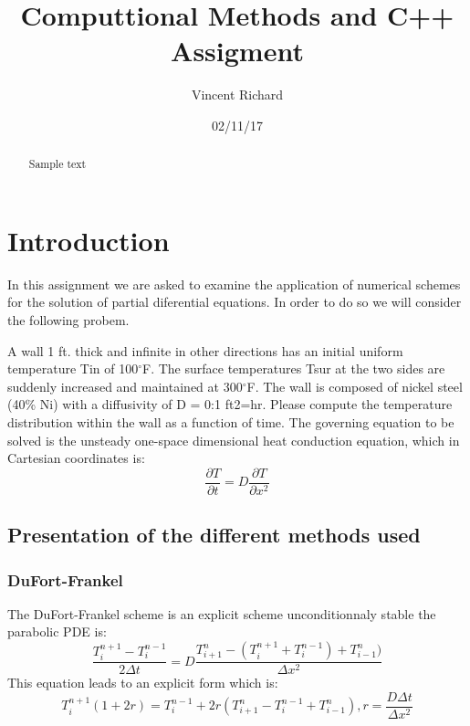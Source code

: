 \documentclass [10 pt, a4 paper]{article}
\author{Vincent Richard}
\date{02/11/17}
\title{Computtional Methods and C++ Assigment}
\begin{document}
\begin{titlepage}
    \maketitle
\end{titlepage}
\newpage

\begin{abstract}
    Sample text
\end{abstract}

\tableofcontents
\listoffigures
\listoftables
\newpage


\section{Introduction}
In this assignment we are asked to examine the application of numerical schemes
for the solution of partial diferential equations. In order to  do so we will consider 
the following probem.

A wall 1 ft. thick and infinite in other directions has an initial uniform temperature Tin of 100$^{\circ}$F. The surface temperatures Tsur at the two
sides are suddenly increased and maintained at 300$^{\circ}$F. The wall is composed of
nickel steel (40\% Ni) with a diffusivity of D = 0:1 ft2=hr. Please compute the
temperature distribution within the wall as a function of time.
The governing equation to be solved is the unsteady one-space dimensional
heat conduction equation, which in Cartesian coordinates is:
\begin{equation}
    \frac{\partial T}{\partial t} = D \frac{\partial T}{\partial x^{2}}
\end{equation}

\subsection{Presentation of the different methods used}

\subsubsection{DuFort-Frankel}
The DuFort-Frankel scheme is an explicit scheme unconditionnaly stable the parabolic PDE is:
\begin{equation}
    \frac{T_{i}^{n+1} - T_{i}^{n-1}}{2\Delta t} = D \frac{T_{i+1}^{n} -(T_{i}^{n+1} + T_{i}^{n-1}) + T_{i-1}^{n})}{\Delta x^{2}}
\end{equation}
This equation leads to an explicit form which is:
\begin{equation}
    T_{i}^{n+1}(1 + 2r) = T_{i}^{n-1} +2r(T_{i+1}^{n} - T_{i}^{n-1} + T_{i-1}^{n}), r =\frac{D\Delta t}{\Delta x^{2}}
\end{equation}
\end{document}
